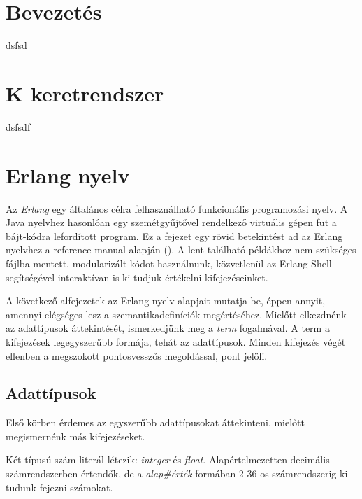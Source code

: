 \documentclass[twoside, a4paper, 12pt]{article}
\title{\CIM}
\author{\SZERZO}
\date{\VEDESEVE}
\begin{document}
\pagestyle{empty}


\cleardoublepage


\tableofcontents
\cleardoublepage

\pagestyle{plain}
\setcounter{page}{1}



\section{Bevezetés}
dsfsd

\section{K keretrendszer}
dsfsdf

\section{Erlang nyelv}
Az \textit{Erlang} egy általános célra felhasználható funkcionális programozási nyelv. A Java nyelvhez hasonlóan egy szemétgyűjtővel rendelkező virtuális gépen fut a bájt-kódra lefordított program. Ez a fejezet egy rövid betekintést ad az Erlang nyelvhez a reference manual alapján (\cite{RefMan}). A lent található példákhoz nem szükséges fájlba mentett, modularizált kódot használnunk, közvetlenül az Erlang Shell segítségével interaktívan is ki tudjuk értékelni kifejezéseinket.

A következő alfejezetek az Erlang nyelv alapjait mutatja be, éppen annyit, amennyi elégséges lesz a szemantikadefiníciók megértéséhez. Mielőtt elkezdnénk az adattípusok áttekintését, ismerkedjünk meg a \textit{term} fogalmával. A term a kifejezések legegyszerűbb formája, tehát az adattípusok. Minden kifejezés végét ellenben a megszokott pontosvesszős megoldással, pont jelöli.

\subsection{Adattípusok}
Első körben érdemes az egyszerűbb adattípusokat áttekinteni, mielőtt megismernénk más kifejezéseket.

Két típusú szám literál létezik: \textit{integer} és \textit{float}. Alapértelmezetten decimális számrendszerben értendők, de a \textit{alap\#érték} formában 2-36-os számrendszerig ki tudunk fejezni számokat.
\end{document}

